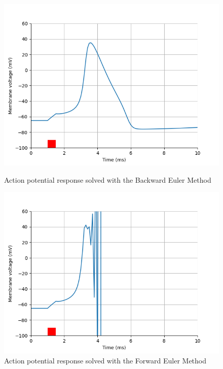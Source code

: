 \documentclass{article}
\begin{document}
    \begin{figure}[htbp]
        \centering
        \begin{minipage}[b]{0.49\textwidth}
            \includegraphics[width=\textwidth]{ac_backward_euler}
            \caption{Action potential response solved with the Backward Euler Method}
            \label{fig:ac_backward_euler}
        \end{minipage}
        \hfill
        \begin{minipage}[b]{0.49\textwidth}
            \includegraphics[width=\textwidth]{ac_forward_euler}
            \caption{Action potential response solved with the Forward Euler Method}
            \label{fig:ac_forward_euler}
        \end{minipage}
    \end{figure}
\end{document}
